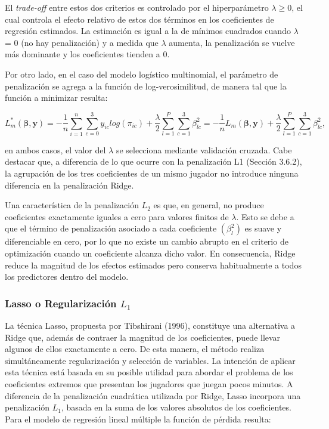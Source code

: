 \documentclass[
  12pt,
]{article}
\begin{document}
El \emph{trade-off} entre estos dos criterios es controlado por el
hiperparámetro \(\lambda \geq 0\), el cual controla el efecto relativo
de estos dos términos en los coeficientes de regresión estimados. La
estimación es igual a la de mínimos cuadrados cuando \(\lambda\) = 0 (no
hay penalización) y a medida que \(\lambda\) aumenta, la penalización se
vuelve más dominante y los coeficientes tienden a 0.

Por otro lado, en el caso del modelo logístico multinomial, el parámetro
de penalización se agrega a la función de log-verosimilitud, de manera
tal que la función a minimizar resulta:

\begin{equation}
L^*_m(\boldsymbol{\beta},\boldsymbol{y})= -\frac{1}{n} \sum_{i=1}^n\sum_{c=0}^3y_{ic}log(\pi_{ic}) + \frac{\lambda}{2} \sum_{l=1}^P\sum_{c=1}^3 \beta_{lc}^2= - \frac{1}{n}L_m(\boldsymbol{\beta},\boldsymbol{y}) + \frac{\lambda}{2} \sum_{l=1}^P\sum_{c=1}^3 \beta_{lc}^2,
\end{equation}

en ambos casos, el valor del \(\lambda\) se selecciona mediante
validación cruzada. Cabe destacar que, a diferencia de lo que ocurre con
la penalización L1 (Sección 3.6.2), la agrupación de los tres
coeficientes de un mismo jugador no introduce ninguna diferencia en la
penalización Ridge.

Una característica de la penalización \(L_2\) es que, en general, no
produce coeficientes exactamente iguales a cero para valores finitos de
\(\lambda\). Esto se debe a que el término de penalización asociado a
cada coeficiente \((\beta_l^2)\) es suave y diferenciable en cero, por
lo que no existe un cambio abrupto en el criterio de optimización cuando
un coeficiente alcanza dicho valor. En consecuencia, Ridge reduce la
magnitud de los efectos estimados pero conserva habitualmente a todos
los predictores dentro del modelo.

\subsubsection{\texorpdfstring{Lasso o Regularización
\(L_1\)}{Lasso o Regularización L\_1}}\label{lasso-o-regularizaciuxf3n-l_1}

La técnica Lasso, propuesta por Tibshirani (1996), constituye una
alternativa a Ridge que, además de contraer la magnitud de los
coeficientes, puede llevar algunos de ellos exactamente a cero. De esta
manera, el método realiza simultáneamente regularización y selección de
variables. La intención de aplicar esta técnica está basada en su
posible utilidad para abordar el problema de los coeficientes extremos
que presentan los jugadores que juegan pocos minutos. A diferencia de la
penalización cuadrática utilizada por Ridge, Lasso incorpora una
penalización \(L_1\), basada en la suma de los valores absolutos de los
coeficientes. Para el modelo de regresión lineal múltiple la función de
pérdida resulta:
\end{document}
